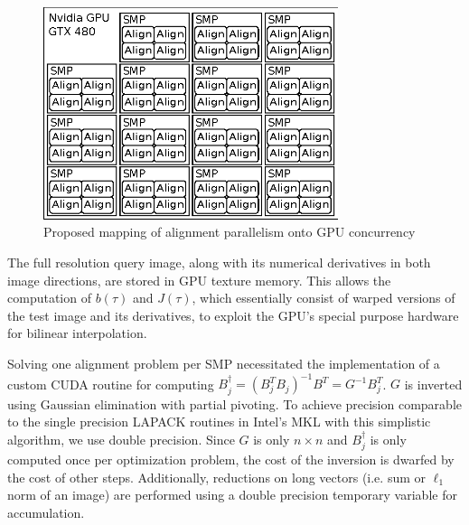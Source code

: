\documentclass[10pt,twocolumn,letterpaper]{article}
\begin{document}
\begin{figure}
\centering
\includegraphics[width=3.4in]{figures/alignment_mapping_gpu}
\caption{Proposed mapping of alignment parallelism onto GPU concurrency}
\label{fig:alignment_mapping_gpu}
\end{figure}

The full resolution query image, along with its numerical derivatives in both
image directions, are stored in GPU texture memory. This  allows the
computation of $b(\tau)$ and $J(\tau)$, which essentially consist of warped
versions of the test image and its derivatives, to exploit the GPU's special
purpose hardware for bilinear interpolation.

Solving one alignment problem per SMP necessitated the implementation of a
custom CUDA routine for computing $B_j^\dagger = (B_j^TB_j)^{-1} B^T = G^{-1} B_j^T$. $G$
is inverted using Gaussian elimination with partial pivoting.  To achieve
precision comparable to the single precision LAPACK routines in Intel's MKL
with this simplistic algorithm, we use double precision.  Since $G$ is only $n
\times n$ and $B_j^\dagger$ is only computed once per optimization problem, the
cost of the inversion is dwarfed by the cost of other steps.  
Additionally, reductions on long vectors (i.e. sum or $\ell_1$ norm
of an image) are performed using a double precision temporary variable for accumulation.
\end{document}
